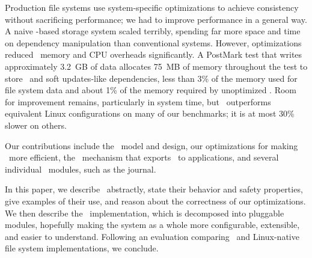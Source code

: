 Production file systems use system-specific optimizations to achieve
 consistency without sacrificing performance; we had to improve
 performance in a general way.
%
A naive \patch-based storage system scaled terribly,
 spending far more space and time on dependency manipulation than
 conventional systems.
%
However, optimizations reduced \patch\ memory and
 CPU overheads significantly.
%
A PostMark test that writes approximately 3.2~GB of data
 allocates 75~MB of memory throughout the test to store \patches\ and
 soft updates-like dependencies, less than 3\% of the memory used for file
 system data and about 1\% of the memory required by unoptimized
 \Featherstitch.
%
Room for improvement remains, particularly in system time, but
 \Featherstitch\ outperforms equivalent Linux configurations on
 many of our benchmarks; it is at most 30\% slower on others.


Our contributions include the \patch\ model and design, our
 optimizations for making \patches\ more efficient,
 the \patchgroup\ mechanism that exports
 \patches\ to applications, and several individual \Kudos\ modules, such as
 the journal.


In this paper, we describe \patches\ abstractly, state their behavior and safety
 properties, give examples of their use, and reason about the
 correctness of our optimizations.
%
We then describe the \Kudos\ implementation, which is decomposed
 into pluggable modules, hopefully making the system as a whole more configurable,
 extensible, and easier to understand.
%
Following an evaluation comparing \Kudos\ and Linux-native file
 system implementations, we conclude.




\begin{comment}
%
Our benchmarks show that our optimizations can reduce the number of
 \patches\ \Kudos\ creates by \patchoptcount\ and the amount of undo data
 memory it allocates by \patchoptundo.
%
Our prototype is not yet as fast as we would like, but it is competitive
 with Linux on many of our benchmarks.
\end{comment}
